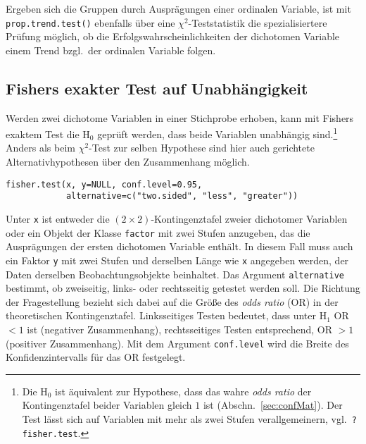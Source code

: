 Ergeben sich die Gruppen durch Ausprägungen einer ordinalen Variable, ist mit \lstinline!prop.trend.test()! ebenfalls über eine $\chi^{2}$-Teststatistik die spezialisiertere Prüfung möglich, ob die Erfolgswahrscheinlichkeiten der dichotomen Variable einem Trend bzgl.\ der ordinalen Variable folgen.

\subsection{Fishers exakter Test auf Unabhängigkeit}
\label{sec:fisherInd}

Werden zwei dichotome Variablen in einer Stichprobe erhoben, kann mit Fishers exaktem Test die $\text{H}_{0}$ geprüft werden, dass beide Variablen unabhängig sind.\footnote{\label{ftn:oddsRatio}Die $\text{H}_{0}$ ist äquivalent zur Hypothese, dass das wahre \emph{odds ratio} der Kontingenztafel beider Variablen gleich $1$ ist (Abschn.\ \ref{sec:confMat}). Der Test lässt sich auf Variablen mit mehr als zwei Stufen verallgemeinern, vgl.\ \lstinline!?fisher.test!.} Anders als beim $\chi^{2}$-Test zur selben Hypothese sind hier auch gerichtete Alternativhypothesen über den Zusammenhang möglich.
\begin{lstlisting}
fisher.test(x, y=NULL, conf.level=0.95,
            alternative=c("two.sided", "less", "greater"))
\end{lstlisting}

Unter \lstinline!x! ist entweder die $(2 \times 2)$-Kontingenztafel zweier dichotomer Variablen oder ein Objekt der Klasse \lstinline!factor! mit zwei Stufen anzugeben, das die Ausprägungen der ersten dichotomen Variable enthält. In diesem Fall muss auch ein Faktor \lstinline!y! mit zwei Stufen und derselben Länge wie \lstinline!x! angegeben werden, der Daten derselben Beobachtungsobjekte beinhaltet. Das Argument \lstinline!alternative! bestimmt, ob zweiseitig, links- oder rechtsseitig getestet werden soll. Die Richtung der Fragestellung bezieht sich dabei auf die Größe des \emph{odds ratio} (OR) in der theoretischen Kontingenztafel. Linksseitiges Testen bedeutet, dass unter $\text{H}_{1}$ OR $< 1$ ist (negativer Zusammenhang), rechtsseitiges Testen entsprechend, OR $> 1$ (positiver Zusammenhang). Mit dem Argument \lstinline!conf.level! wird die Breite des Konfidenzintervalls für das OR festgelegt.

